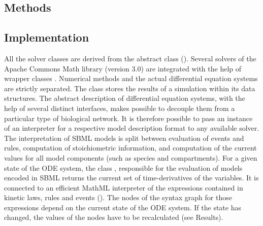 \documentclass[10pt]{bmc_article}
\newenvironment{bmcformat}{\begin{raggedright}\baselineskip20pt\sloppy\setboolean{publ}{false}}{\end{raggedright}\baselineskip20pt\sloppy}
\begin{document}
\begin{bmcformat}
\section*{Methods}

\subsection*{Implementation}

All the solver classes are derived from the abstract class \AbstractDESSolver ().
Several solvers of the Apache Commons Math library (version 3.0) are integrated with the help of wrapper classes .
Numerical methods and the actual differential equation systems are strictly separated.
The class \MultiTable stores the results of a simulation within its \Block data structures. 
%
The abstract description of differential equation systems, with the help of
several distinct interfaces, makes  possible to decouple them from a
particular type of biological network.
It is therefore possible to pass an instance of an interpreter for a respective
model description format to any available solver.
%
The interpretation of \acs{SBML} models is split between evaluation of events
and rules, computation of stoichiometric information, and computation of the
current values for all model components (such as species and compartments).
%
For a given state of the \acs{ODE} system, the class \SBMLinterpreter,
responsible for the evaluation of models encoded in \acs{SBML}\COR{,} returns
the current set of time-derivatives of the variables.
It is connected to an efficient MathML interpreter of the expressions contained
in kinetic laws, rules and events (\ASTNodeInterpreter).
The nodes of the syntax graph for those expressions depend on the current state
of the \acs{ODE} system.
If the state has changed, the values of the nodes have to be recalculated (see
Results).


\end{bmcformat}
\end{document}
